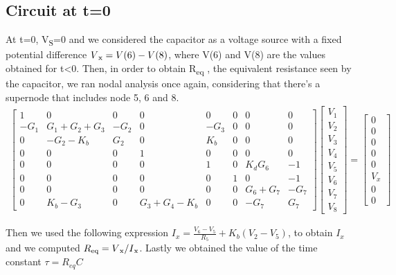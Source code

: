 \subsection{Circuit at t=0}
At t=0,  V\textsubscript{S}=0 and we considered the capacitor as a voltage source with a fixed potential difference $V\textsubscript{x} = V(6)-V(8)$, where V(6) and V(8) are the values obtained for t<0. Then, in order to obtain R\textsubscript{eq} , the equivalent resistance seen by the capacitor,  we ran nodal analysis once again, considering that there's a supernode that includes node 5, 6 and 8.
\begin{gather}
\begin{bmatrix}
1    & 0           & 0    & 0           & 0 & 0 & 0 & 0\\
-G_1 & G_1+G_2+G_3 & -G_2 & 0           & -G_3 & 0 & 0 & 0\\
0    & -G_2-K_b    & G_2  & 0           & K_b & 0 & 0 & 0\\
0    & 0           & 0    & 1           & 0 & 0 & 0 & 0\\
0    & 0           & 0    & 0           & 1 & 0 & K_d G_6 & -1\\
0    & 0           & 0    & 0           & 0 & 1 & 0 & -1\\
0    & 0           & 0    & 0           & 0 & 0 & G_6+G_7 & -G_7\\
0    & K_b-G_3     & 0    & G_3+G_4-K_b & 0 & 0 & -G_7 & G_7
\end{bmatrix}
\begin{bmatrix}
 V_1\\
 V_2\\
 V_3\\
 V_4\\
 V_5\\
 V_6\\
 V_7\\
 V_8
\end{bmatrix}
=
\begin{bmatrix}
 0\\
 0\\
 0\\
 0\\
 0\\
 V_x\\
 0\\
 0
\end{bmatrix}
\end{gather}


Then we used the following expression $I_x = \frac{V_6-V_5}{R_5} + K_b(V_2 - V_5)$, to obtain $I_x$ and we computed $R\textsubscript{eq} = V\textsubscript{x} / I\textsubscript{x}$. Lastly we obtained the value of the time constant $\tau=R_{eq}C$


